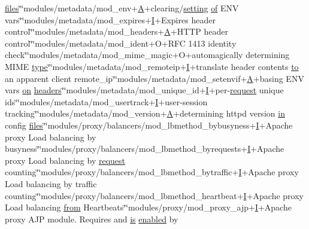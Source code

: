 \begin{DoxyCompactItemize}
\hyperlink{pcregrep_8txt_a5aaeef01bce395cfcb41dd64a3bf8607}{files}\char`\"{}\char`\"{}modules/metadata/mod\+\_\+env+\hyperlink{pcregrep_8txt_ae7af65aae7738174b8f4c0662da372d5}{A}+clearing/\hyperlink{pcretest_8txt_a935b0b98e07f1e5b6c06e9821ff32fec}{setting} \hyperlink{pcre_8txt_a9d5b55a535a7d176d14b62d664b47b4d}{of} E\+NV vars\char`\"{}\char`\"{}modules/metadata/mod\+\_\+expires+\hyperlink{apr__md5_8c_ac0eafdc9ee161b71e7af98af736952fd}{I}+Expires header control\char`\"{}\char`\"{}modules/metadata/mod\+\_\+headers+\hyperlink{pcregrep_8txt_ae7af65aae7738174b8f4c0662da372d5}{A}+H\+T\+TP header control\char`\"{}\char`\"{}modules/metadata/mod\+\_\+ident+O+R\+FC 1413 identity check\char`\"{}\char`\"{}modules/metadata/mod\+\_\+mime\+\_\+magic+O+automagically determining M\+I\+ME \hyperlink{pcre_8txt_a2463fbbe8b0c90b90db12195e1edaa5d}{type}\char`\"{}\char`\"{}modules/metadata/mod\+\_\+remoteip+\hyperlink{apr__md5_8c_ac0eafdc9ee161b71e7af98af736952fd}{I}+translate header contents \hyperlink{pcretest_8txt_aa22c98f630e4b3fe86ee17ce5150c62f}{to} an apparent client remote\+\_\+ip\char`\"{}\char`\"{}modules/metadata/mod\+\_\+setenvif+\hyperlink{pcregrep_8txt_ae7af65aae7738174b8f4c0662da372d5}{A}+basing E\+NV vars \hyperlink{group__apr__thread__proc_gade8f959a935ed315f9f55422c7de9903}{on} \hyperlink{group__APACHE__CORE__PROTO_gad27a8cead3a9e245c2e63cbf9a15f8c1}{headers}\char`\"{}\char`\"{}modules/metadata/mod\+\_\+unique\+\_\+id+\hyperlink{apr__md5_8c_ac0eafdc9ee161b71e7af98af736952fd}{I}+per-\/\hyperlink{ab_8c_ae55c2591fd7f232c48d3f252f18a869a}{request} unique ids\char`\"{}\char`\"{}modules/metadata/mod\+\_\+usertrack+\hyperlink{apr__md5_8c_ac0eafdc9ee161b71e7af98af736952fd}{I}+user-\/session tracking\char`\"{}\char`\"{}modules/metadata/mod\+\_\+version+\hyperlink{pcregrep_8txt_ae7af65aae7738174b8f4c0662da372d5}{A}+determining httpd version \hyperlink{group__apr__thread__proc_ga2e46fea00cc2238744ebca5061c62bcc}{in} config \hyperlink{pcregrep_8txt_a5aaeef01bce395cfcb41dd64a3bf8607}{files}\char`\"{}\char`\"{}modules/proxy/balancers/mod\+\_\+lbmethod\+\_\+bybusyness+\hyperlink{apr__md5_8c_ac0eafdc9ee161b71e7af98af736952fd}{I}+Apache proxy Load balancing by busyness\char`\"{}\char`\"{}modules/proxy/balancers/mod\+\_\+lbmethod\+\_\+byrequests+\hyperlink{apr__md5_8c_ac0eafdc9ee161b71e7af98af736952fd}{I}+Apache proxy Load balancing by \hyperlink{ab_8c_ae55c2591fd7f232c48d3f252f18a869a}{request} counting\char`\"{}\char`\"{}modules/proxy/balancers/mod\+\_\+lbmethod\+\_\+bytraffic+\hyperlink{apr__md5_8c_ac0eafdc9ee161b71e7af98af736952fd}{I}+Apache proxy Load balancing by traffic counting\char`\"{}\char`\"{}modules/proxy/balancers/mod\+\_\+lbmethod\+\_\+heartbeat+\hyperlink{apr__md5_8c_ac0eafdc9ee161b71e7af98af736952fd}{I}+Apache proxy Load balancing \hyperlink{pcregrep_8txt_a900bb06a4314d99c8ad08d1ceffd114e}{from} Heartbeats\char`\"{}\char`\"{}modules/proxy/mod\+\_\+proxy\+\_\+ajp+\hyperlink{apr__md5_8c_ac0eafdc9ee161b71e7af98af736952fd}{I}+Apache proxy A\+JP module.  Requires and \hyperlink{NON-AUTOTOOLS-BUILD_8txt_a2569119f3fd3f0d7d7ecea3c96acb0bf}{is} \hyperlink{group__APR__Util__Bucket__Brigades_ga03e6cca0c879c0443efb431c30c14f76}{enabled} by 
\end{DoxyCompactItemize}
